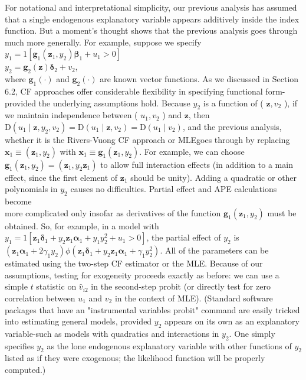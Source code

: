 \documentclass[10pt]{article}
\begin{document}
For notational and interpretational simplicity, our previous analysis has assumed that a single endogenous explanatory variable appears additively inside the index function. But a moment's thought shows that the previous analysis goes through much more generally. For example, suppose we specify\\
$y_{1}=1\left[\mathbf{g}_{1}\left(\mathbf{z}_{1}, y_{2}\right) \boldsymbol{\beta}_{1}+u_{1}>0\right]$\\
$y_{2}=\mathbf{g}_{2}(\mathbf{z}) \boldsymbol{\delta}_{2}+v_{2}$,\\
where $\mathbf{g}_{1}(\cdot)$ and $\mathbf{g}_{2}(\cdot)$ are known vector functions. As we discussed in Section 6.2, CF approaches offer considerable flexibility in specifying functional form-provided the underlying assumptions hold. Because $y_{2}$ is a function of ( $\mathbf{z}, v_{2}$ ), if we maintain independence between ( $u_{1}, v_{2}$ ) and $\mathbf{z}$, then $\mathrm{D}\left(u_{1} \mid \mathbf{z}, y_{2}, v_{2}\right)=\mathrm{D}\left(u_{1} \mid \mathbf{z}, v_{2}\right)=\mathrm{D}\left(u_{1} \mid v_{2}\right)$, and the previous analysis, whether it is the Rivers-Vuong CF approach or MLEgoes through by replacing $\mathbf{x}_{1} \equiv\left(\mathbf{z}_{1}, y_{2}\right)$ with $\mathbf{x}_{1} \equiv \mathbf{g}_{1}\left(\mathbf{z}_{1}, y_{2}\right)$. For example, we can choose $\mathbf{g}_{1}\left(\mathbf{z}_{1}, y_{2}\right)=\left(\mathbf{z}_{1}, y_{2} \mathbf{z}_{1}\right)$ to allow full interaction effects (in addition to a main effect, since the first element of $\mathbf{z}_{1}$ should be unity). Adding a quadratic or other polynomials in $y_{2}$ causes no difficulties. Partial effect and APE calculations become\\
more complicated only insofar as derivatives of the function $\mathbf{g}_{1}\left(\mathbf{z}_{1}, y_{2}\right)$ must be obtained. So, for example, in a model with $y_{1}=1\left[\mathbf{z}_{1} \boldsymbol{\delta}_{1}+y_{2} \mathbf{z}_{1} \boldsymbol{\alpha}_{1}+y_{1} y_{2}^{2}+u_{1}>0\right]$, the partial effect of $y_{2}$ is $\left(\mathbf{z}_{1} \boldsymbol{\alpha}_{1}+2 \gamma_{1} y_{2}\right) \phi\left(\mathbf{z}_{1} \boldsymbol{\delta}_{1}+y_{2} \mathbf{z}_{1} \boldsymbol{\alpha}_{1}+\gamma_{1} y_{2}^{2}\right)$. All of the parameters can be estimated using the two-step CF estimator or the MLE. Because of our assumptions, testing for exogeneity proceeds exactly as before: we can use a simple $t$ statistic on $\hat{v}_{i 2}$ in the second-step probit (or directly test for zero correlation between $u_{1}$ and $v_{2}$ in the context of MLE). (Standard software packages that have an "instrumental variables probit" command are easily tricked into estimating general models, provided $y_{2}$ appears on its own as an explanatory variable-such as models with quadratics and interactions in $y_{2}$. One simply specifies $y_{2}$ as the lone endogenous explanatory variable with other functions of $y_{2}$ listed as if they were exogenous; the likelihood function will be properly computed.)
\end{document}
